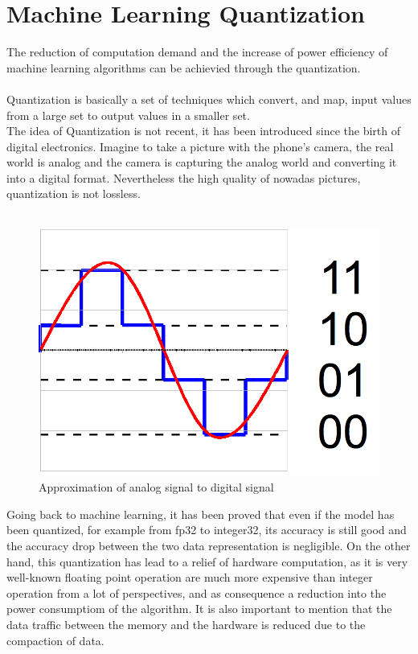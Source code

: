 \section{Machine Learning Quantization}
The reduction of computation demand and the increase of power efficiency of machine learning algorithms can be achievied through the quantization.\\\\

Quantization is basically a set of techniques which convert, and map, input values from a large set to output values in a smaller set.\\The idea of Quantization is not recent, it has been introduced since the birth of digital electronics. Imagine to take a picture with the phone's camera, the real world is analog and the camera is capturing the analog world and converting it into a digital format.  Nevertheless the high quality of nowadas pictures, quantization is not lossless.\\\\
\begin{figure}[H]
\centering
\captionsetup{justification=centering}
\includegraphics[scale=0.4]{./figure/quant.PNG}
\caption{Approximation of analog signal to digital signal\cite{WEBSITE:12}}
\label{fig:quant}
\end{figure}
Going back to machine learning, it has been proved that even if the model has been quantized, for example from fp32 to integer32, its accuracy is still good and the accuracy drop between the two data representation is negligible\cite{paper:8}. On the other hand, this quantization has lead to a relief of hardware computation, as it is very well-known floating point operation are much more expensive than integer operation from a lot of perspectives, and as consequence a reduction into the power consumptiom of the algorithm. It is also important to mention that the data traffic between the memory and the hardware is reduced due to the compaction of data.\\\\

